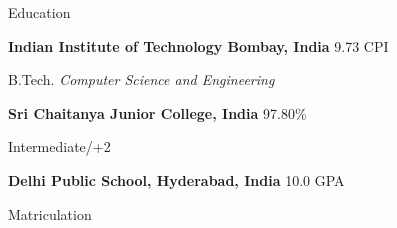 \begin{rubric}{Education}

\entry*[2019 -- 2022*]%
	\textbf{Indian Institute of Technology Bombay, India} \hfill 9.73 CPI
	\par B.Tech. \emph{Computer Science and Engineering}


\entry*[2017 -- 2019]%
	\textbf{Sri Chaitanya Junior College, India} \hfill 97.80\% \par
	Intermediate/+2
	

\entry*[2010 -- 2017]%
	\textbf{Delhi Public School, Hyderabad, India} \hfill 10.0 GPA \par
	Matriculation
\end{rubric}